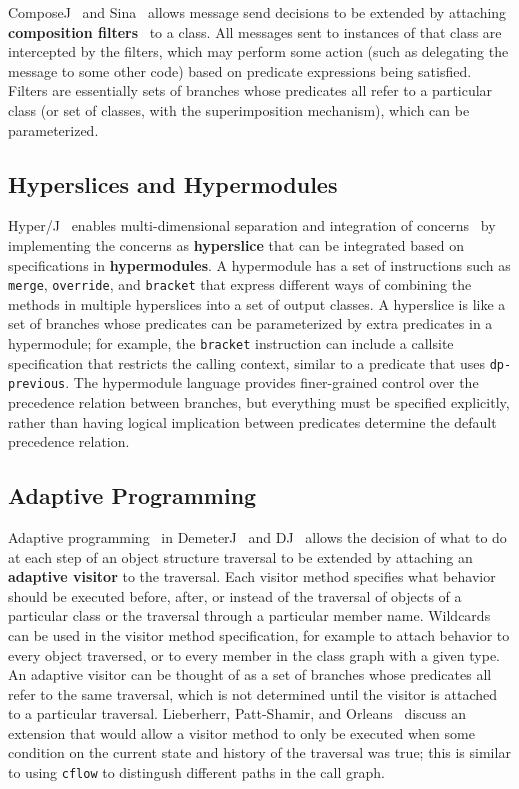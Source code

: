 \documentclass{acm_proc_article-sp}
\newcommand{\defn}[1]{\textbf{#1}}
\newcommand{\code}[1]{\texttt{#1}}
\begin{document}
ComposeJ~\cite{ComposeJ} and Sina~\cite{Sina} allows message send
decisions to be extended by attaching \defn{composition
filters}~\cite{comp-filt} to a class.  All messages sent to instances
of that class are intercepted by the filters, which may perform some
action (such as delegating the message to some other code) based on
predicate expressions being satisfied.  Filters are essentially sets
of branches whose predicates all refer to a particular class (or set
of classes, with the superimposition mechanism), which can be
parameterized.

\subsection{Hyperslices and Hypermodules}

Hyper/J~\cite{HyperJ} enables multi-dimensional separation and
integration of concerns~\cite{MDSOC} by implementing the concerns as
\defn{hyperslice} that can be integrated based on specifications in
\defn{hypermodules}.  A hypermodule has a set of instructions
such as \code{merge}, \code{override}, and \code{bracket} that express 
different ways of combining the methods in multiple hyperslices into
a set of output classes.  A hyperslice is like a set of branches whose 
predicates can be parameterized by extra predicates in a hypermodule;
for example, the \code{bracket} instruction can include a callsite
specification that restricts the calling context, similar to a
predicate that uses \code{dp-previous}.  The hypermodule language
provides finer-grained control over the precedence relation
between branches, but everything must be specified explicitly, rather
than having logical implication between predicates determine the
default precedence relation.

\subsection{Adaptive Programming}

Adaptive programming~\cite{AP-book} in DemeterJ~\cite{DemeterJ} and
DJ~\cite{DJ-reflection} allows the decision of what to do at each step
of an object structure traversal to be extended by attaching an
\defn{adaptive visitor} to the traversal.  Each visitor method
specifies what behavior should be executed before, after, or instead
of the traversal of objects of a particular class or the traversal
through a particular member name.  Wildcards can be used in the
visitor method specification, for example to attach behavior to every
object traversed, or to every member in the class graph with a given
type.  An adaptive visitor can be thought of as a set of branches
whose predicates all refer to the same traversal, which is not
determined until the visitor is attached to a particular traversal.
Lieberherr, Patt-Shamir, and Orleans~\cite{strategies} discuss an
extension that would allow a visitor method to only be executed when
some condition on the current state and history of the traversal was
true; this is similar to using \code{cflow} to distingush different
paths in the call graph.
\end{document}
